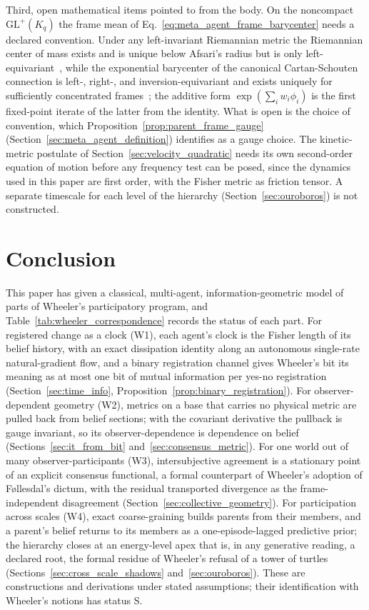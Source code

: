 \documentclass[11pt]{article}
\begin{document}
Third, open mathematical items pointed to from the body. On the noncompact $\mathrm{GL}^+(K_q)$ the frame mean of Eq.~\eqref{eq:meta_agent_frame_barycenter} needs a declared convention. Under any left-invariant Riemannian metric the Riemannian center of mass exists and is unique below Afsari's radius but is only left-equivariant~\cite{Afsari2011}, while the exponential barycenter of the canonical Cartan-Schouten connection is left-, right-, and inversion-equivariant and exists uniquely for sufficiently concentrated frames~\cite{PennecArsigny2013}; the additive form $\exp(\sum_i w_i \phi_i)$ is the first fixed-point iterate of the latter from the identity. What is open is the choice of convention, which Proposition~\ref{prop:parent_frame_gauge} (Section~\ref{sec:meta_agent_definition}) identifies as a gauge choice. The kinetic-metric postulate of Section~\ref{sec:velocity_quadratic} needs its own second-order equation of motion before any frequency test can be posed, since the dynamics used in this paper are first order, with the Fisher metric as friction tensor. A separate timescale for each level of the hierarchy (Section~\ref{sec:ouroboros}) is not constructed.

\section{Conclusion}\label{sec:global_conclusion}

This paper has given a classical, multi-agent, information-geometric model of parts of Wheeler's participatory program, and Table~\ref{tab:wheeler_correspondence} records the status of each part. For registered change as a clock (W1), each agent's clock is the Fisher length of its belief history, with an exact dissipation identity along an autonomous single-rate natural-gradient flow, and a binary registration channel gives Wheeler's bit its meaning as at most one bit of mutual information per yes-no registration (Section~\ref{sec:time_info}, Proposition~\ref{prop:binary_registration}). For observer-dependent geometry (W2), metrics on a base that carries no physical metric are pulled back from belief sections; with the covariant derivative the pullback is gauge invariant, so its observer-dependence is dependence on belief (Sections~\ref{sec:it_from_bit} and~\ref{sec:consensus_metric}). For one world out of many observer-participants (W3), intersubjective agreement is a stationary point of an explicit consensus functional, a formal counterpart of Wheeler's adoption of F{\o}llesdal's dictum, with the residual transported divergence as the frame-independent disagreement (Section~\ref{sec:collective_geometry}). For participation across scales (W4), exact coarse-graining builds parents from their members, and a parent's belief returns to its members as a one-episode-lagged predictive prior; the hierarchy closes at an energy-level apex that is, in any generative reading, a declared root, the formal residue of Wheeler's refusal of a tower of turtles (Sections~\ref{sec:cross_scale_shadows} and~\ref{sec:ouroboros}). These are constructions and derivations under stated assumptions; their identification with Wheeler's notions has status S.
\end{document}
